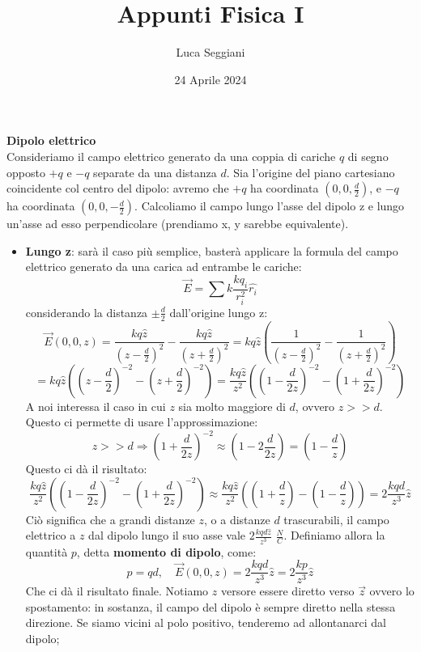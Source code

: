 \documentclass[a4paper,12pt]{article}
\title{Appunti Fisica I}
\author{Luca Seggiani}
\date{24 Aprile 2024}
\begin{document}
\maketitle
\par\smallskip
\textbf{Dipolo elettrico} \\
Consideriamo il campo elettrico generato da una coppia di cariche $q$ di segno opposto $+q$ e $-q$ separate da una distanza $d$. Sia l'origine del piano cartesiano coincidente col centro del dipolo: avremo che $+q$ ha coordinata
$(0, 0, \frac{d}{2})$, e $-q$ ha coordinata $(0, 0, -\frac{d}{2})$. Calcoliamo il campo lungo l'asse del dipolo z e lungo un'asse ad esso perpendicolare (prendiamo x, y sarebbe equivalente).
\begin{itemize}
  \item \textbf{Lungo z}: sarà il caso più semplice, basterà applicare la formula del campo elettrico generato da una carica ad entrambe le cariche:
    $$ \vec{E} = \sum k\frac{kq_i}{r_i^2}\hat{r_i} $$
    considerando la distanza $\pm\frac{d}{2}$ dall'origine lungo z:
    $$ \vec{E}(0, 0, z) = \frac{kq\hat{z}}{\left(z-\frac{d}{2}\right)^2} - \frac{kq\hat{z}}{\left(z+\frac{d}{2}\right)^2} = kq\hat{z}\left(\frac{1}{\left(z-\frac{d}{2}\right)^2} - \frac{1}{\left(z+\frac{d}{2}\right)^2}\right) $$
    $$ = kq\hat{z}\left(\left(z-\frac{d}{2}\right)^{-2} - \left(z+\frac{d}{2}\right)^{-2}\right) = \frac{kq\hat{z}}{z^2}\left( \left(1 - \frac{d}{2z}\right)^{-2} - \left(1 + \frac{d}{2z}\right)^{-2} \right) $$
    A noi interessa il caso in cui $z$ sia molto maggiore di $d$, ovvero $z >> d$. Questo ci permette di usare l'approssimazione:
    $$ z >> d \Rightarrow \left(1 + \frac{d}{2z}\right)^{-2} \approx \left(1 - 2\frac{d}{2z}\right) = \left(1 - \frac{d}{z}\right) $$
    Questo ci dà il risultato:
    $$ \frac{kq\hat{z}}{z^2}\left( \left(1 - \frac{d}{2z}\right)^{-2} - \left(1 + \frac{d}{2z}\right)^{-2} \right) \approx \frac{kq\hat{z}}{z^2}\left(\left(1+\frac{d}{z}\right) - \left(1-\frac{d}{z}\right)\right) = 2\frac{kqd}{z^3}\hat{z} $$
    Ciò significa che a grandi distanze $z$, o a distanze $d$ trascurabili, il campo elettrico a $z$ dal dipolo lungo il suo asse vale $2\frac{kqd\hat{z}}{z^3}$ $\frac{N}{C}$. Definiamo allora la quantità $p$, detta \textbf{momento di dipolo}, come:
    $$ p = qd, \quad \vec{E}(0, 0, z) = 2\frac{kqd}{z^3}\hat{z} = 2\frac{kp}{z^3}\hat{z} $$
    Che ci dà il risultato finale. Notiamo $\hat{z}$ versore essere diretto verso $\vec{z}$ ovvero lo spostamento: in sostanza, il campo del dipolo è sempre diretto nella stessa direzione. Se siamo vicini al polo positivo, tenderemo ad allontanarci dal dipolo;

\end{itemize}
\end{document}
